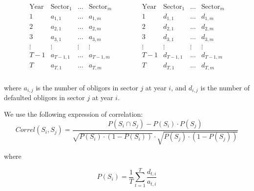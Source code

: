 \documentclass[a4paper,12pt,final]{article}
\begin{document}
\begin{center}
\begin{displaymath}
\begin{array}{ccc}
\begin{array}{c|ccc}
\mathrm{Year}     & \mathrm{Sector}_1   & \dots  & \mathrm{Sector}_{m} \\
\hline
1        & a_{1,1}    & \dots  & a_{1,m}    \\
2        & a_{2,1}    & \dots  & a_{2,m}    \\
3        & a_{3,1}    & \dots  & a_{3,m}    \\
\vdots   & \vdots     & \vdots & \vdots     \\
T-1      & a_{T-1,1}  & \dots  & a_{T-1,m}  \\
T        & a_{T,1}    & \dots  & a_{T,m}    \\
\end{array}
& \qquad &
\begin{array}{c|ccc}
\mathrm{Year}     & \mathrm{Sector}_1   & \dots  & \mathrm{Sector}_{m} \\
\hline
1        & d_{1,1}    & \dots  & d_{1,m}    \\
2        & d_{2,1}    & \dots  & d_{2,m}    \\
3        & d_{3,1}    & \dots  & d_{3,m}    \\
\vdots   & \vdots     & \vdots & \vdots     \\
T-1      & d_{T-1,1}  & \dots  & d_{T-1,m}  \\
T        & d_{T,1}    & \dots  & d_{T,m}    \\
\end{array}
\end{array}
\end{displaymath}
\end{center}

where $a_{i,j}$ is the number of obligors in sector $j$ at year $i$, and
$d_{i,j}$ is the number of defaulted obligors in sector $j$ at year $i$.
\newline

We use the following expression of correlation:
\begin{displaymath}
Correl(S_i,S_j) = \frac{P(S_i \cap S_j) - P(S_i) \cdot P(S_j)}{\sqrt{P(S_i) \cdot (1-P(S_i))} \cdot \sqrt{P(S_j) \cdot (1-P(S_j))}}
\end{displaymath}

where

\begin{displaymath}
P(S_i) = \frac{1}{T} \sum_{t=1}^{T} \frac{d_{t,i}}{a_{t,i}}
\end{displaymath}
\end{document}
